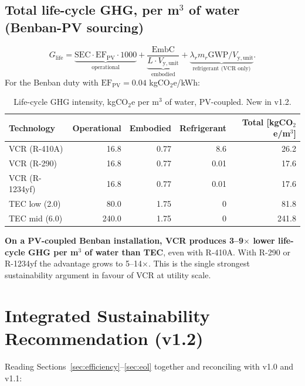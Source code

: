 \documentclass[11pt,a4paper]{article}
\begin{document}
\subsection{Total life-cycle GHG, per m$^3$ of water (Benban-PV sourcing)}
\begin{equation}
G_{\mathrm{life}} = \underbrace{\mathrm{SEC}\cdot \mathrm{EF}_{\mathrm{PV}}\cdot 1000}_{\text{operational}} + \underbrace{\frac{\mathrm{EmbC}}{L\cdot V_{\mathrm{y,unit}}}}_{\text{embodied}} + \underbrace{\lambda_r m_r \mathrm{GWP}/V_{\mathrm{y,unit}}}_{\text{refrigerant (VCR only)}}.
\end{equation}
For the Benban duty with $\mathrm{EF}_{\mathrm{PV}}=0.04$ kgCO$_2$e/kWh:
\begin{table}[h]
\centering\small
\caption{Life-cycle GHG intensity, kgCO$_2$e per m$^3$ of water, PV-coupled. New in v1.2.}
\label{tab:ghg_life}
\begin{tabular}{@{}lrrrr@{}}
\toprule
\textbf{Technology} & \textbf{Operational} & \textbf{Embodied} & \textbf{Refrigerant} & \textbf{Total [kgCO$_2$e/m$^3$]}\\
\midrule
VCR (R-410A)   & 16.8  & 0.77 & 8.6  & 26.2 \\
VCR (R-290)    & 16.8  & 0.77 & 0.01 & 17.6 \\
VCR (R-1234yf) & 16.8  & 0.77 & 0.01 & 17.6 \\
TEC low (2.0)  & 80.0  & 1.75 & 0    & 81.8 \\
TEC mid (6.0)  & 240.0 & 1.75 & 0    & 241.8 \\
\bottomrule
\end{tabular}
\end{table}

\noindent
\textbf{On a PV-coupled Benban installation, VCR produces 3--9$\times$ lower life-cycle GHG per m$^3$ of water than TEC}, even with R-410A. With R-290 or R-1234yf the advantage grows to 5--14$\times$. This is the single strongest sustainability argument in favour of VCR at utility scale.

\section{Integrated Sustainability Recommendation (v1.2)}
\label{sec:integrated_reco}

Reading Sections~\ref{sec:efficiency}--\ref{sec:eol} together and reconciling with v1.0 and v1.1:
\end{document}
